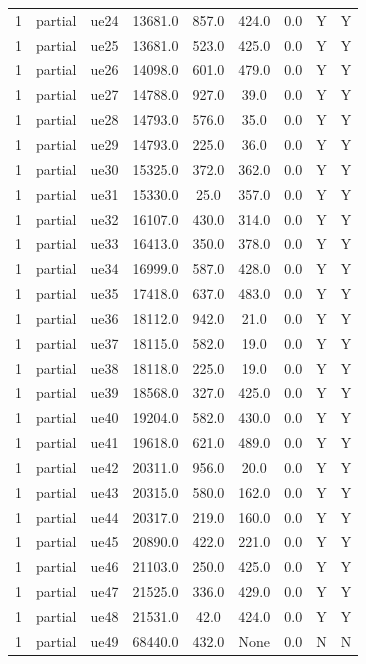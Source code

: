 \begin{table}[ht]
\begin{tabular}{|c|c|c|c|c|c|c|c|c|}
1 & partial & ue24 & 13681.0 & 857.0 & 424.0 & 0.0 & Y & Y \\
1 & partial & ue25 & 13681.0 & 523.0 & 425.0 & 0.0 & Y & Y \\
1 & partial & ue26 & 14098.0 & 601.0 & 479.0 & 0.0 & Y & Y \\
1 & partial & ue27 & 14788.0 & 927.0 & 39.0 & 0.0 & Y & Y \\
1 & partial & ue28 & 14793.0 & 576.0 & 35.0 & 0.0 & Y & Y \\
1 & partial & ue29 & 14793.0 & 225.0 & 36.0 & 0.0 & Y & Y \\
1 & partial & ue30 & 15325.0 & 372.0 & 362.0 & 0.0 & Y & Y \\
1 & partial & ue31 & 15330.0 & 25.0 & 357.0 & 0.0 & Y & Y \\
1 & partial & ue32 & 16107.0 & 430.0 & 314.0 & 0.0 & Y & Y \\
1 & partial & ue33 & 16413.0 & 350.0 & 378.0 & 0.0 & Y & Y \\
1 & partial & ue34 & 16999.0 & 587.0 & 428.0 & 0.0 & Y & Y \\
1 & partial & ue35 & 17418.0 & 637.0 & 483.0 & 0.0 & Y & Y \\
1 & partial & ue36 & 18112.0 & 942.0 & 21.0 & 0.0 & Y & Y \\
1 & partial & ue37 & 18115.0 & 582.0 & 19.0 & 0.0 & Y & Y \\
1 & partial & ue38 & 18118.0 & 225.0 & 19.0 & 0.0 & Y & Y \\
1 & partial & ue39 & 18568.0 & 327.0 & 425.0 & 0.0 & Y & Y \\
1 & partial & ue40 & 19204.0 & 582.0 & 430.0 & 0.0 & Y & Y \\
1 & partial & ue41 & 19618.0 & 621.0 & 489.0 & 0.0 & Y & Y \\
1 & partial & ue42 & 20311.0 & 956.0 & 20.0 & 0.0 & Y & Y \\
1 & partial & ue43 & 20315.0 & 580.0 & 162.0 & 0.0 & Y & Y \\
1 & partial & ue44 & 20317.0 & 219.0 & 160.0 & 0.0 & Y & Y \\
1 & partial & ue45 & 20890.0 & 422.0 & 221.0 & 0.0 & Y & Y \\
1 & partial & ue46 & 21103.0 & 250.0 & 425.0 & 0.0 & Y & Y \\
1 & partial & ue47 & 21525.0 & 336.0 & 429.0 & 0.0 & Y & Y \\
1 & partial & ue48 & 21531.0 & 42.0 & 424.0 & 0.0 & Y & Y \\
1 & partial & ue49 & 68440.0 & 432.0 & None & 0.0 & N & N \\

\end{tabular}
\end{table}

